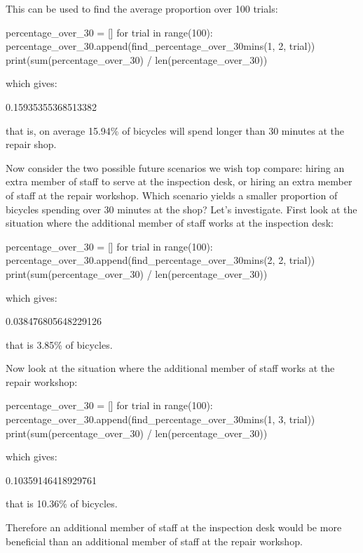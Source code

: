 This can be used to find the average proportion over 100 trials:

\begin{pyin}
percentage_over_30 = []
for trial in range(100):
    percentage_over_30.append(find_percentage_over_30mins(1, 2, trial))
print(sum(percentage_over_30) / len(percentage_over_30))
\end{pyin}

which gives:

\begin{pyout}
0.15935355368513382
\end{pyout}

that is, on average 15.94\% of bicycles will spend longer than 30 minutes at the
repair shop.

Now consider the two possible future scenarios we wish top compare: hiring an
extra member of staff to serve at the inspection desk, or hiring an extra member
of staff at the repair workshop. Which scenario yields a smaller proportion of
bicycles spending over 30 minutes at the shop? Let's investigate. First look at
the situation where the additional member of staff works at the inspection desk:

\begin{pyin}
percentage_over_30 = []
for trial in range(100):
    percentage_over_30.append(find_percentage_over_30mins(2, 2, trial))
print(sum(percentage_over_30) / len(percentage_over_30))
\end{pyin}

which gives:

\begin{pyout}
0.038476805648229126
\end{pyout}

that is 3.85\% of bicycles.

Now look at the situation where the additional member of staff works at the
repair workshop:

\begin{pyin}
percentage_over_30 = []
for trial in range(100):
    percentage_over_30.append(find_percentage_over_30mins(1, 3, trial))
print(sum(percentage_over_30) / len(percentage_over_30))
\end{pyin}

which gives:

\begin{pyout}
0.10359146418929761
\end{pyout}

that is 10.36\% of bicycles.

Therefore an additional member of staff at the inspection desk would be more
beneficial than an additional member of staff at the repair workshop.


